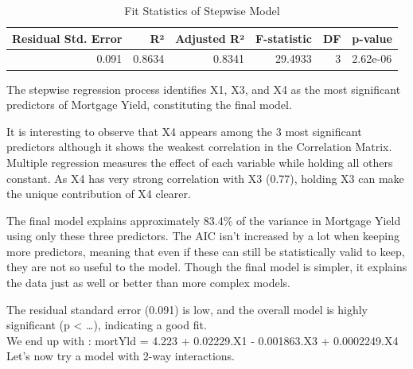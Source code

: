 \documentclass[
  11pt,
]{article}
\begin{document}
\begin{table}[!h]
\centering
\caption{\label{tab:unnamed-chunk-13}Fit Statistics of Stepwise Model}
\centering
\fontsize{8}{10}\selectfont
\begin{tabular}[t]{rrrrrl}
\toprule
Residual Std. Error & R² & Adjusted R² & F-statistic & DF & p-value\\
\midrule
0.091 & 0.8634 & 0.8341 & 29.4933 & 3 & 2.62e-06\\
\bottomrule
\end{tabular}
\end{table}

The stepwise regression process identifies X1, X3, and X4 as the most
significant predictors of Mortgage Yield, constituting the final model.

It is interesting to observe that X4 appears among the 3 most
significant predictors although it shows the weakest correlation in the
Correlation Matrix. Multiple regression measures the effect of each
variable while holding all others constant. As X4 has very strong
correlation with X3 (0.77), holding X3 can make the unique contribution
of X4 clearer.

The final model explains approximately 83.4\% of the variance in
Mortgage Yield using only these three predictors. The AIC isn't
increased by a lot when keeping more predictors, meaning that even if
these can still be statistically valid to keep, they are not so useful
to the model. Though the final model is simpler, it explains the data
just as well or better than more complex models.

The residual standard error (0.091) is low, and the overall model is
highly significant (p \textless{} \ldots), indicating a good fit.\\
We end up with : mortYld = 4.223 + 0.02229.X1 - 0.001863.X3 +
0.0002249.X4\\

Let's now try a model with 2-way interactions.
\end{document}
